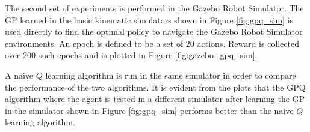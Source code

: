 \documentclass[12pt]{report}
\begin{document}
The second set of experiments is performed in the Gazebo Robot Simulator. The GP learned in the basic kinematic simulators shown in Figure \ref{fig:gpq_sim} is used directly to find the optimal policy to navigate the Gazebo Robot Simulator environments. An epoch is defined to be a set of $20$ actions. Reward is collected over $200$ such epochs and is plotted in Figure \ref{fig:gazebo_gpq_sim}.

A naive $Q$ learning algorithm is run in the same simulator in order to compare the performance of the two algorithms. It is evident from the plots that the GPQ algorithm where the agent is tested in a different simulator after learning the GP in the simulator shown in Figure \ref{fig:gpq_sim} performs better than the naive $Q$ learning algorithm.

\begin{figure}[H]
	\centering   
	

\end{figure}
\end{document}
